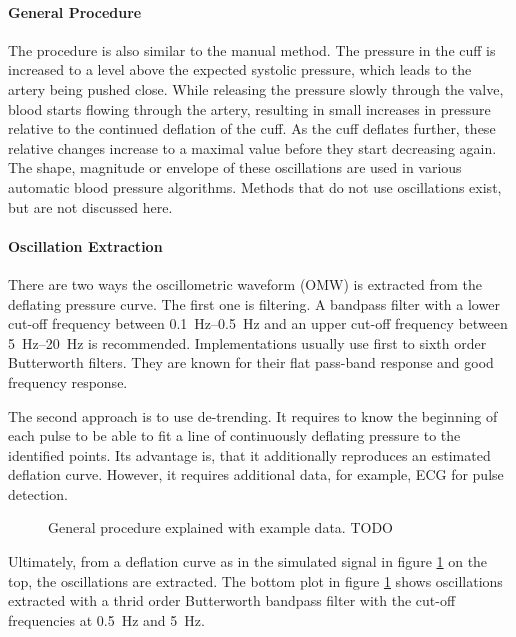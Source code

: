 \paragraph{General Procedure} The procedure is also similar to the manual method. The pressure in the cuff is increased to a level above the expected systolic pressure, which leads to the artery being pushed close. While releasing the pressure slowly through the valve, blood starts flowing through the artery, resulting in small increases in pressure relative to the continued deflation of the cuff. As the cuff deflates further, these relative changes increase to a maximal value before they start decreasing again.\cite{Forouzanfar2015,Drzewiecki1994,Ursino1996} The shape, magnitude or envelope of these oscillations are used in various automatic blood pressure algorithms. Methods that do not use oscillations exist, but are not discussed here. 


\paragraph{Oscillation Extraction} There are two ways the oscillometric waveform (OMW) is extracted from the deflating pressure curve. The first one is filtering. A bandpass filter with a lower cut-off frequency between \SIrange{0.1}{0.5}{\Hz} and an upper cut-off frequency between \SIrange{5}{20}{\Hz} is recommended. \cite{Forouzanfar2015} Implementations usually use first \cite{Lim2015} to sixth order \cite{Jazbinsek2010} Butterworth filters. They are known for their flat pass-band response and good frequency response. 

The second approach is to use de-trending. It requires to know the beginning of each pulse to be able to fit a line of continuously deflating pressure to the identified points. Its advantage is, that it additionally reproduces an estimated deflation curve. However, it requires additional data, for example, ECG for pulse detection.\cite{Forouzanfar2015}

\begin{figure}[h]
\centering
\caption{General procedure explained with example data. TODO}
\label{fig:osc}
\end{figure}

Ultimately, from a deflation curve as in the simulated signal in figure \ref{fig:osc} on the top, the oscillations are extracted. The bottom plot in figure \ref{fig:osc} shows oscillations extracted with a thrid order Butterworth bandpass filter with the cut-off frequencies at \SI{0.5}{\Hz} and \SI{5}{\Hz}. \cite{Babbs2012} 


